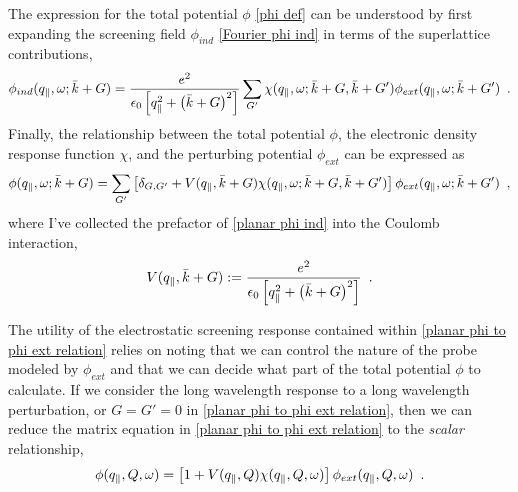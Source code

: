 The expression for the total potential $\phi$ \eqref{phi def} can be understood by first expanding the screening field $\phi_{ind}$ \eqref{Fourier phi ind} in terms of the superlattice contributions,
\begin{equation}
    \label{planar phi ind}
     \phi_{ind}(q_\parallel,\omega;\bar k+G) = \frac{e^2}{\epsilon_0\left[ q_\parallel^2+\left(\bar k+G\right)^2\right]} \sum_{G'}\chi(q_\parallel,\omega;\bar k+G, \bar k+G')
     \phi_{ext}(q_\parallel,\omega;\bar k+G')
     \,\,\,.
\end{equation}
Finally, the relationship between the total potential $\phi$, the electronic density response function $\chi$, and the perturbing potential $\phi_{ext}$ can be expressed as
\begin{equation}
    \label{planar phi to phi ext relation}
    \phi(q_\parallel,\omega;\bar k+G) 
    =
    \sum_{G'}
    \left[
    \delta_{G,G'}
    +
    V(q_\parallel,\bar k+G)
    \chi(q_\parallel,\omega;\bar k+G, \bar k+G')
    \right]
    \phi_{ext}(q_\parallel,\omega;\bar k+ G')
    \,\,\,,
\end{equation}
where I've collected the prefactor of \eqref{planar phi ind} into the Coulomb interaction,
\begin{equation}
    \label{V def}
    V(q_\parallel,\bar k+G):=
    \frac{e^2}{\epsilon_0\left[ q_\parallel^2+\left(\bar k+G\right)^2\right]}
    \,\,\,.
\end{equation}

The utility of the electrostatic screening response contained within \eqref{planar phi to phi ext relation} relies on noting that we can control the nature of the probe modeled by $\phi_{ext}$ and that we can decide what part of the total potential $\phi$ to calculate.  If we consider the long wavelength response to a long wavelength perturbation, or $G=G'=0$ in \eqref{planar phi to phi ext relation}, then we can reduce the matrix equation in \eqref{planar phi to phi ext relation} to the {\it scalar} relationship,
\begin{equation}
    \label{long wavelength linear response relationship}
    \phi(q_\parallel, Q, \omega) 
    =
    \left[
    1
    +
    V(q_\parallel, Q)
    \chi(q_\parallel, Q, \omega)
    \right]
    \phi_{ext}(q_\parallel, Q, \omega)
    \,\,\,.
\end{equation}